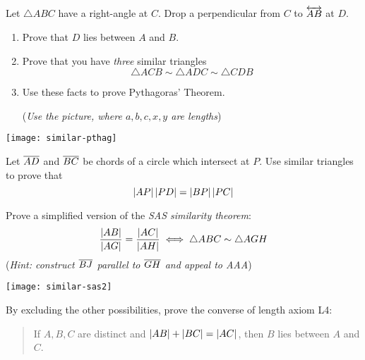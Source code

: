 \begin{exercises}
\exstart Let $\triangle ABC$ have a right-angle at $C$. Drop a perpendicular from $C$ to $\overleftrightarrow{AB}$ at $D$.
\begin{enumerate}\setcounter{enumi}{1}
  \begin{minipage}[t]{0.6\linewidth}\vspace{-8pt}
  \item[]\begin{enumerate}\itemsep0pt
    \item Prove that $D$ lies between $A$ and $B$.
    \item Prove that you have \emph{three} similar triangles
    \[\triangle ACB\sim\triangle ADC\sim\triangle CDB\]
  	\item Use these facts to prove Pythagoras' Theorem.\par
  	(\emph{Use the picture, where $a,b,c,x,y$ are lengths})
	\end{enumerate}
	\end{minipage}\hfill\begin{minipage}[t]{0.39\linewidth}\vspace{0pt}
	\flushright\texttt{[image: similar-pthag]}
	\end{minipage}
	
  \item\label{exs:intchords} Let $\overline{AD}$ and $\overline{BC}$ be chords of a circle which intersect at $P$. Use similar triangles to prove that
  \[\left| AP\right|\left| PD\right|=\left| BP\right|\left| PC\right|\]
  
  
  
  \begin{minipage}[t]{0.65\linewidth}\vspace{0pt}
  	\item Prove a simplified version of the \emph{SAS similarity theorem}:
    \[\frac{\left| AB\right|}{\left| AG\right|}=\frac{\left| AC\right|}{\left| AH\right|}\iff\triangle ABC\sim\triangle AGH\]
    (\emph{Hint: construct $\overline{BJ}$ parallel to $\overline{GH}$ and appeal to AAA})
  \end{minipage}\hfill\begin{minipage}[t]{0.35\linewidth}\vspace{-5pt}
  \flushright\texttt{[image: similar-sas2]}
  \end{minipage}
	
	\item By excluding the other possibilities, prove the converse of length axiom L4:
	\begin{quote}
	If $A,B,C$ are distinct and $\left| AB\right|+\left| BC\right|=\left| AC\right|$, then $B$ lies between $A$ and $C$.
	\end{quote}
	

\end{enumerate}
\end{exercises}
